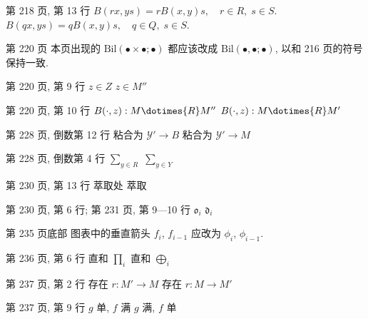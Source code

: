 \documentclass{AJerrata}
\begin{document}
\begin{Errata}
        \item[第 218 页, 第 13 行]
        \Orig $B(rx, ys) = rB(x,y)s, \quad r \in R, \; s \in S$.
        \newline
        \Corr $B(qx, ys) = qB(x,y)s, \quad q \in Q, \; s \in S$.

        \item[第 220 页]
        本页出现的 $\mathrm{Bil}(\bullet \times \bullet; \bullet)$ 都应该改成 $\mathrm{Bil}(\bullet, \bullet; \bullet)$, 以和 216 页的符号保持一致.
        
        \item[第 220 页, 第 9 行]
        \Orig $z \in Z$
        \Corr $z \in M''$
        
        \item[第 220 页, 第 10 行]
        \Orig $B(\cdot, z): M \dotimes{R} M''$
        \Corr $B(\cdot, z): M \dotimes{R} M'$
        
        \item[第 228 页, 倒数第 12 行]
        \Orig 粘合为 $\mathcal{Y}' \to B$
        \Corr 粘合为 $\mathcal{Y}' \to M$
       
        \item[第 228 页, 倒数第 4 行]
        \Orig $\sum_{y \in R}$
        \Corr $\sum_{y \in Y}$
        
        \item[第 230 页, 第 13 行]
        \Orig 萃取处
        \Corr 萃取
        
		\item[第 230 页, 第 6 行; 第 231 页, 第 9---10 行]
		\Orig $\mathfrak{o}_i$
		\Corr $\mathfrak{d}_i$
        
        \item[第 235 页底部]
        图表中的垂直箭头 $f_i$, $f_{i-1}$ 应改为 $\phi_i$, $\phi_{i-1}$.
        
        \item[第 236 页, 第 6 行]
        \Orig 直和 $\prod_i$
        \Corr 直和 $\bigoplus_i$
        
        \item[第 237 页, 第 2 行]
        \Orig 存在 $r: M' \to M$
        \Corr 存在 $r: M \to M'$

	\item[第 237 页, 第 9 行]
	\Orig $g$ 单, $f$ 满
	\Corr $g$ 满, $f$ 单
	

\end{Errata}
\end{document}
